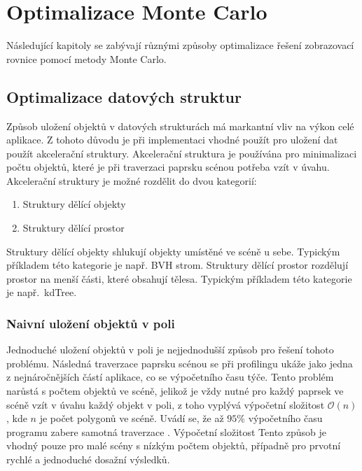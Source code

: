 \documentclass[czech,master]{diploma}
\begin{document}
\clearpage
\chapter{Optimalizace Monte Carlo}\label{sec:reduction}
Následující kapitoly se zabývají různými způsoby optimalizace řešení zobrazovací rovnice pomocí metody Monte Carlo.

\section{Optimalizace datových struktur}
Způsob uložení objektů v datových strukturách má markantní vliv na výkon celé aplikace. Z tohoto důvodu je při implementaci vhodné použít pro uložení dat použít akcelerační struktury. Akcelerační struktura je používána pro minimalizaci počtu objektů, které je při traverzaci paprsku scénou potřeba vzít v úvahu. Akcelerační struktury je možné rozdělit do dvou kategorií:
\begin{enumerate}
  \item Struktury dělící objekty
  \item Struktury dělící prostor
\end{enumerate}
\par
Struktury dělící objekty shlukují objekty umístěné ve scéně u sebe. Typickým příkladem této kategorie je např. BVH strom. Struktury dělící prostor rozdělují prostor na menší části, které obsahují tělesa. Typickým příkladem této kategorie je např.\ kdTree.

\subsection{Naivní uložení objektů v poli}
Jednoduché uložení objektů v poli je nejjednodušší způsob pro řešení tohoto problému. Následná traverzace paprsku scénou se při profilingu ukáže jako jedna z nejnáročnějších částí aplikace, co se výpočetního času týče. Tento problém narůstá s počtem objektů ve scéně, jelikož je vždy nutné pro každý paprsek ve scéně vzít v úvahu každý objekt v poli, z toho vyplývá výpočetní složitost \(\mathcal{O}(n)\), kde \(n\) je počet polygonů ve scéně. Uvádí se, že až \(95\%\) výpočetního času programu zabere samotná traverzace \cite{Meister2018}. Výpočetní složitost Tento způsob je vhodný pouze pro malé scény s nízkým počtem objektů, případně pro prvotní rychlé a jednoduché dosažní výsledků.
\end{document}

